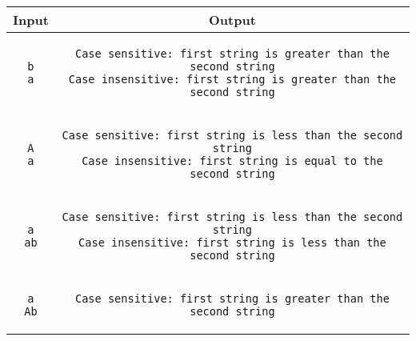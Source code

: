 \documentclass[a4paper]{scrartcl}
\theoremstyle{definition}
\begin{document}
\begin{center}
\renewcommand{\arraystretch}{2}
\begin{tabular}{c|c}

Input & Output\\
\hline
\begin{minipage}{0.9\textwidth - 33.7em}
\begin{verbatim}
b
a
\end{verbatim}
\end{minipage}&
\begin{minipage}{33.7em}
\begin{verbatim}
Case sensitive: first string is greater than the second string
Case insensitive: first string is greater than the second string
\end{verbatim}
\end{minipage}\\
\hline
\begin{minipage}{.9\textwidth-33.7em}
\begin{verbatim}
A
a
\end{verbatim}
\end{minipage}&
\begin{minipage}{33.7em}
\begin{verbatim}
Case sensitive: first string is less than the second string
Case insensitive: first string is equal to the second string
\end{verbatim}
\end{minipage}\\
\hline
\begin{minipage}{.9\textwidth-33.7em}
\begin{verbatim}
a
ab
\end{verbatim}
\end{minipage}&
\begin{minipage}{33.7em}
\begin{verbatim}
Case sensitive: first string is less than the second string
Case insensitive: first string is less than the second string
\end{verbatim}
\end{minipage}\\
\hline
\begin{minipage}{.9\textwidth-33.7em}
\begin{verbatim}
a
Ab
\end{verbatim}
\end{minipage}&
\begin{minipage}{33.7em}
\begin{verbatim}
Case sensitive: first string is greater than the second string

\end{verbatim}
\end{minipage}
\end{tabular}
\end{center}
\end{document}
